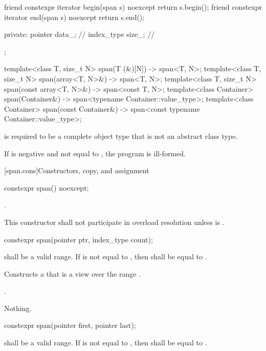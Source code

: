 \begin{codeblock}
\begin{codeblock}
\begin{codeblock}
\begin{codeblock}
{{    friend constexpr iterator begin(span s) noexcept { return s.begin(); }
    friend constexpr iterator end(span s) noexcept { return s.end(); }

  private:
    pointer data_;    // \expos
    index_type size_; // \expos
  };

  template<class T, size_t N>
    span(T (&)[N]) -> span<T, N>;
  template<class T, size_t N>
    span(array<T, N>&) -> span<T, N>;
  template<class T, size_t N>
    span(const array<T, N>&) -> span<const T, N>;
  template<class Container>
    span(Container&) -> span<typename Container::value_type>;
  template<class Container>
    span(const Container&) -> span<const typename Container::value_type>;
}
\end{codeblock}

\pnum
{} is required to be
a complete object type that is not an abstract class type.

\pnum
If  is negative and not equal to ,
the program is ill-formed.

[span.cons]{Constructors, copy, and assignment}

%
\begin{itemdecl}
constexpr span() noexcept;
\end{itemdecl}
\begin{itemdescr}
\pnum
\ensures
{}.

\pnum
\remarks
This constructor shall not participate in overload resolution
unless  is .
\end{itemdescr}

%
\begin{itemdecl}
constexpr span(pointer ptr, index_type count);
\end{itemdecl}
\begin{itemdescr}
\pnum
\requires {} shall be a valid range.
If  is not equal to ,
then  shall be equal to .

\pnum
\effects
Constructs a  that is a view over the range .

\pnum
\ensures
{}.

\pnum
\throws
Nothing.
\end{itemdescr}

%
\begin{itemdecl}
constexpr span(pointer first, pointer last);
\end{itemdecl}
\begin{itemdescr}
\pnum
\requires
{} shall be a valid range.
If  is not equal to ,
then  shall be equal to .


\end{itemdescr}
\end{codeblock}
\end{codeblock}
\end{codeblock}
